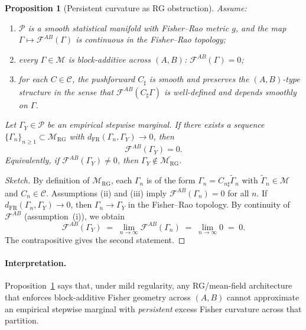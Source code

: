 \documentclass[11pt]{article}
\newtheorem{proposition}{Proposition}
\newcommand{\1}{\mathbf{1}}
\begin{document}
\begin{proposition}[Persistent curvature as RG obstruction]
\label{prop:mf-obstruction}
Assume:
\begin{enumerate}[label=(\roman*),leftmargin=1.6em]
  \item $\mathcal P$ is a smooth statistical manifold with Fisher--Rao
        metric $g$, and the map
        $\Gamma \mapsto \mathcal F^{AB}(\Gamma)$ is continuous in the
        Fisher--Rao topology;
  \item every $\Gamma \in \mathcal M$ is block-additive across $(A,B)$:
        $\mathcal F^{AB}(\Gamma)=0$;
  \item for each $C\in\mathcal C$, the pushforward $C_{\sharp}$ is
        smooth and preserves the $(A,B)$-type structure in the sense
        that $\mathcal F^{AB}(C_{\sharp}\Gamma)$ is well-defined and
        depends smoothly on $\Gamma$.
\end{enumerate}
Let $\Gamma_Y\in\mathcal P$ be an empirical stepwise marginal. If there exists a sequence $\{\Gamma_n\}_{n\ge1} \subset \mathcal M_{\mathrm{RG}}$ with $d_{\mathrm{FR}}(\Gamma_n,\Gamma_Y) \to 0$, then
\[
	\mathcal F^{AB}(\Gamma_Y) = 0.
\]
Equivalently, if $\mathcal F^{AB}(\Gamma_Y)\neq 0$, then $\Gamma_Y \notin \overline{\mathcal M_{\mathrm{RG}}}$.
\end{proposition}

\begin{proof}[Sketch]
By definition of $\mathcal M_{\mathrm{RG}}$, each $\Gamma_n$ is of the form $\Gamma_n = C_{n\sharp}\tilde\Gamma_n$ with $\tilde\Gamma_n\in\mathcal M$ and $C_n\in\mathcal C$. Assumptions (ii) and (iii) imply $\mathcal F^{AB}(\Gamma_n)=0$ for all $n$. If $d_{\mathrm{FR}}(\Gamma_n,\Gamma_Y) \to 0$, then $\Gamma_n \to \Gamma_Y$ in the Fisher--Rao topology. By continuity of $\mathcal F^{AB}$ (assumption~(i)), we obtain
\[
\mathcal F^{AB}(\Gamma_Y)
\;=\;
\lim_{n\to\infty} \mathcal F^{AB}(\Gamma_n)
\;=\;
\lim_{n\to\infty} 0
\;=\;
0.
\]
The contrapositive gives the second statement.
\end{proof}

\paragraph{Interpretation.}
Proposition~\ref{prop:mf-obstruction} says that, under mild regularity, any RG/mean-field architecture that enforces block-additive Fisher geometry across $(A,B)$ cannot approximate an empirical stepwise marginal with
\emph{persistent} excess Fisher curvature across that partition.
\end{document}
